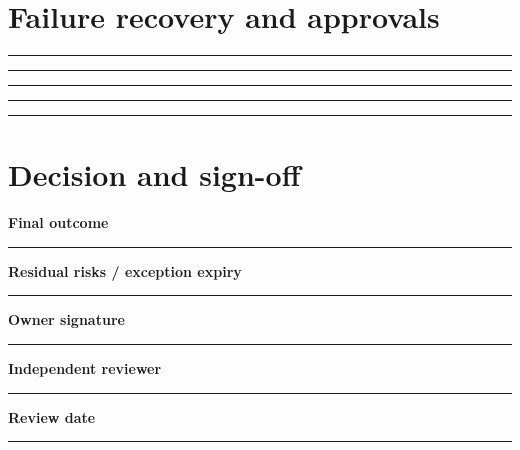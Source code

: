 \documentclass[11pt,letterpaper]{article}
\begin{document}
\section{Failure recovery and approvals}
\vspace{2mm}
\noindent\rule{0.93\linewidth}{0.4pt}\par\vspace{13pt}
\noindent\rule{0.93\linewidth}{0.4pt}\par\vspace{13pt}
\noindent\rule{0.93\linewidth}{0.4pt}\par\vspace{13pt}
\noindent\rule{0.93\linewidth}{0.4pt}\par\vspace{13pt}
\noindent\rule{0.93\linewidth}{0.4pt}\par\vspace{13pt}
\section{Decision and sign-off}
\noindent\textbf{Final outcome}\par\nobreak\vspace{6pt}\noindent\rule{0.93\linewidth}{0.4pt}\par\vspace{14pt}
\noindent\textbf{Residual risks / exception expiry}\par\nobreak\vspace{6pt}\noindent\rule{0.93\linewidth}{0.4pt}\par\vspace{14pt}
\noindent\textbf{Owner signature}\par\nobreak\vspace{6pt}\noindent\rule{0.93\linewidth}{0.4pt}\par\vspace{14pt}
\noindent\textbf{Independent reviewer}\par\nobreak\vspace{6pt}\noindent\rule{0.93\linewidth}{0.4pt}\par\vspace{14pt}
\noindent\textbf{Review date}\par\nobreak\vspace{6pt}\noindent\rule{0.93\linewidth}{0.4pt}\par\vspace{14pt}
\end{document}
